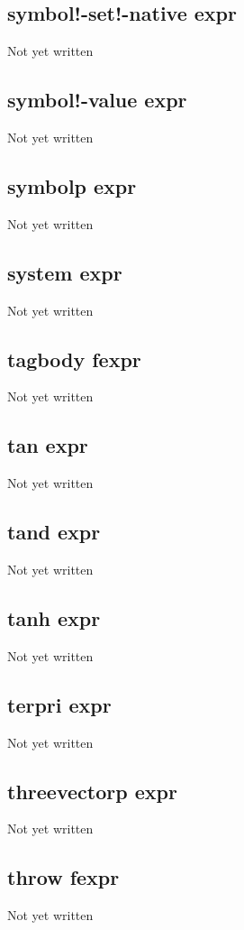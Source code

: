 \documentclass[a4paper,11pt]{article}
\begin{document}
{\subsection{\ttfamily symbol!-set!-native expr}
   Not yet written

\subsection{\ttfamily symbol!-value expr}
   Not yet written

\subsection{\ttfamily symbolp expr}
   Not yet written

\subsection{\ttfamily system expr}
   Not yet written

\subsection{\ttfamily tagbody fexpr}
   Not yet written

\subsection{\ttfamily tan expr}
   Not yet written

\subsection{\ttfamily tand expr}
   Not yet written

\subsection{\ttfamily tanh expr}
   Not yet written

\subsection{\ttfamily terpri expr}
   Not yet written

\subsection{\ttfamily threevectorp expr}
   Not yet written

\subsection{\ttfamily throw fexpr}
   Not yet written

}
\end{document}
